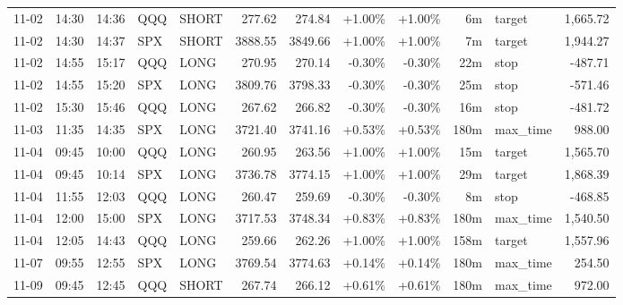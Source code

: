 \documentclass[11pt,a4paper,twoside]{article}
\begin{document}
\begin{center}
\begin{longtable}{>{\color{txtmain}}l l l l l r r r r r >{\color{txtmain}}l r}
11-02 & 14:30 & 14:36 & QQQ & SHORT & 277.62 & 274.84 & \textcolor{wingreen}{+1.00\%} & \textcolor{wingreen}{+1.00\%} & 6m & target & \textcolor{wingreen}{1,665.72} \\
11-02 & 14:30 & 14:37 & SPX & SHORT & 3888.55 & 3849.66 & \textcolor{wingreen}{+1.00\%} & \textcolor{wingreen}{+1.00\%} & 7m & target & \textcolor{wingreen}{1,944.27} \\
11-02 & 14:55 & 15:17 & QQQ & LONG & 270.95 & 270.14 & \textcolor{lossred}{-0.30\%} & \textcolor{lossred}{-0.30\%} & 22m & stop & \textcolor{lossred}{-487.71} \\
11-02 & 14:55 & 15:20 & SPX & LONG & 3809.76 & 3798.33 & \textcolor{lossred}{-0.30\%} & \textcolor{lossred}{-0.30\%} & 25m & stop & \textcolor{lossred}{-571.46} \\
11-02 & 15:30 & 15:46 & QQQ & LONG & 267.62 & 266.82 & \textcolor{lossred}{-0.30\%} & \textcolor{lossred}{-0.30\%} & 16m & stop & \textcolor{lossred}{-481.72} \\
11-03 & 11:35 & 14:35 & SPX & LONG & 3721.40 & 3741.16 & \textcolor{wingreen}{+0.53\%} & \textcolor{wingreen}{+0.53\%} & 180m & max\_time & \textcolor{wingreen}{988.00} \\
11-04 & 09:45 & 10:00 & QQQ & LONG & 260.95 & 263.56 & \textcolor{wingreen}{+1.00\%} & \textcolor{wingreen}{+1.00\%} & 15m & target & \textcolor{wingreen}{1,565.70} \\
11-04 & 09:45 & 10:14 & SPX & LONG & 3736.78 & 3774.15 & \textcolor{wingreen}{+1.00\%} & \textcolor{wingreen}{+1.00\%} & 29m & target & \textcolor{wingreen}{1,868.39} \\
11-04 & 11:55 & 12:03 & QQQ & LONG & 260.47 & 259.69 & \textcolor{lossred}{-0.30\%} & \textcolor{lossred}{-0.30\%} & 8m & stop & \textcolor{lossred}{-468.85} \\
11-04 & 12:00 & 15:00 & SPX & LONG & 3717.53 & 3748.34 & \textcolor{wingreen}{+0.83\%} & \textcolor{wingreen}{+0.83\%} & 180m & max\_time & \textcolor{wingreen}{1,540.50} \\
11-04 & 12:05 & 14:43 & QQQ & LONG & 259.66 & 262.26 & \textcolor{wingreen}{+1.00\%} & \textcolor{wingreen}{+1.00\%} & 158m & target & \textcolor{wingreen}{1,557.96} \\
11-07 & 09:55 & 12:55 & SPX & LONG & 3769.54 & 3774.63 & \textcolor{wingreen}{+0.14\%} & \textcolor{wingreen}{+0.14\%} & 180m & max\_time & \textcolor{wingreen}{254.50} \\
11-09 & 09:45 & 12:45 & QQQ & SHORT & 267.74 & 266.12 & \textcolor{wingreen}{+0.61\%} & \textcolor{wingreen}{+0.61\%} & 180m & max\_time & \textcolor{wingreen}{972.00} \\

\end{longtable}
\end{center}
\end{document}
